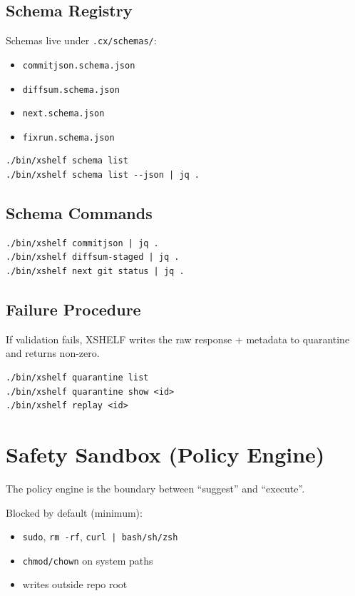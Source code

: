 \documentclass[11pt]{article}
\begin{document}
\subsection{Schema Registry}
Schemas live under \texttt{.cx/schemas/}:
\begin{itemize}
  \item \texttt{commitjson.schema.json}
  \item \texttt{diffsum.schema.json}
  \item \texttt{next.schema.json}
  \item \texttt{fixrun.schema.json}
\end{itemize}

\begin{lstlisting}[style=cx]
./bin/xshelf schema list
./bin/xshelf schema list --json | jq .
\end{lstlisting}

\subsection{Schema Commands}
\begin{lstlisting}[style=cx]
./bin/xshelf commitjson | jq .
./bin/xshelf diffsum-staged | jq .
./bin/xshelf next git status | jq .
\end{lstlisting}

\subsection{Failure Procedure}
If validation fails, XSHELF writes the raw response + metadata to quarantine and returns non-zero.

\begin{lstlisting}[style=cx]
./bin/xshelf quarantine list
./bin/xshelf quarantine show <id>
./bin/xshelf replay <id>
\end{lstlisting}

\section{Safety Sandbox (Policy Engine)}
The policy engine is the boundary between ``suggest'' and ``execute''.

Blocked by default (minimum):
\begin{itemize}
  \item \texttt{sudo}, \texttt{rm -rf}, \texttt{curl | bash/sh/zsh}
  \item \texttt{chmod/chown} on system paths
  \item writes outside repo root
\end{itemize}
\end{document}
